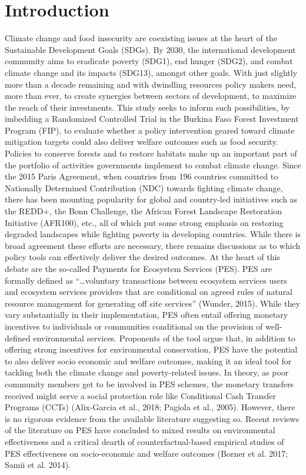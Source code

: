 \documentclass[preprint,12pt]{elsarticle}
\begin{document}
\newpage 
\section{Introduction}
Climate change and food insecurity are coexisting issues at the heart of the Sustainable Development Goals (SDGs). By 2030, the international development community aims to eradicate poverty (SDG1), end hunger (SDG2), and combat climate change and its impacts (SDG13), amongst other goals. With just slightly more than a decade remaining and with dwindling resources policy makers need, more than ever, to create synergies between sectors of development, to maximize the reach of their investments. This study seeks to inform such possibilities, by imbedding a Randomized Controlled Trial in the Burkina Faso Forest Investment Program (FIP), to evaluate whether a policy intervention geared toward climate mitigation targets could also deliver welfare outcomes such as food security.
\\

Policies to conserve forests and to restore habitats make up an important part of the portfolio of activities governments implement to combat climate change. Since the 2015 Paris Agreement, when countries from 196 countries committed to Nationally Determined Contribution (NDC) towards fighting climate change, there has been mounting popularity for global and country-led initiatives such as the REDD+, the Bonn Challenge, the African Forest Landscape Restoration Initiative (AFR100), etc., all of which put some strong emphasis on restoring degraded landscapes while fighting poverty in developing countries. While there is broad agreement these efforts are necessary, there remains discussions as to which policy tools can effectively deliver the desired outcomes. 
At the heart of this debate are the so-called Payments for Ecosystem Services (PES). PES are formally defined as “…voluntary transactions between ecosystem services users and ecosystem services providers that are conditional on agreed rules of natural resource management for generating off site services” (Wunder, 2015). While they vary substantially in their implementation, PES often entail offering monetary incentives to individuals or communities conditional on the provision of well-defined environmental services. Proponents of the tool argue that, in addition to offering strong incentives for environmental conservation, PES have the potential to also deliver socio economic and welfare outcomes, making it an ideal tool for tackling both the climate change and poverty-related issues. In theory, as poor community members get to be involved in PES schemes, the monetary transfers received might serve a social protection role like Conditional Cash Transfer Programs (CCTs) (Alix-Garcia et al., 2018; Pagiola et al., 2005). 
However, there is no rigorous evidence from the available literature suggesting so. Recent reviews of the literature on PES have concluded to mixed results on environmental effectiveness and a critical dearth of counterfactual-based empirical studies of PES effectiveness on socio-economic and welfare outcomes (Borner et al. 2017; Samii et al. 2014). 
\\
\end{document}
